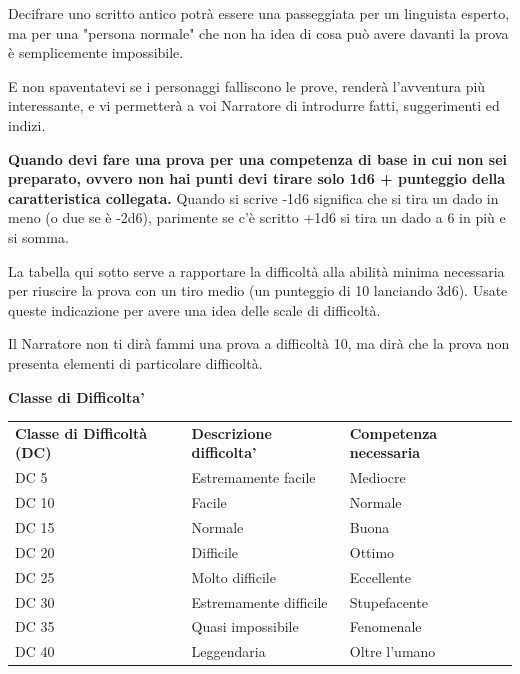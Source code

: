 \documentclass[a4paper,11pt,twoside,openany]{book}
\begin{document}
Decifrare uno scritto antico potrà essere una passeggiata per un linguista esperto, ma per una "persona normale" che non ha idea di cosa può avere davanti la prova è semplicemente impossibile.

E non spaventatevi se i personaggi falliscono le prove, renderà l'avventura più interessante, e vi permetterà a voi Narratore di introdurre fatti, suggerimenti ed indizi.

\bigskip

\textbf{Quando devi fare una prova per una competenza di base in cui non sei preparato, ovvero non hai punti devi tirare solo 1d6 + punteggio della caratteristica collegata.}
Quando si scrive -1d6 significa che si tira un dado in meno (o due se è -2d6), parimente se c'è scritto +1d6 si tira un dado a 6 in più e si somma.

\bigskip

La tabella qui sotto serve a rapportare la difficoltà alla abilità minima necessaria per riuscire la prova con un tiro medio (un punteggio di 10 lanciando 3d6). Usate queste indicazione per avere una idea delle scale di difficoltà.

Il Narratore non ti dirà fammi una prova a difficoltà 10, ma dirà che la prova non presenta elementi di particolare difficoltà.

\bigskip

\textbf{Classe di Difficolta'}
\medskip

\begin{tabular}{lll}
	\toprule
	\textbf{Classe di Difficoltà (DC)} & \textbf{Descrizione difficolta'} & \textbf{ Competenza necessaria}\\
	DC 5               & Estremamente facile              & Mediocre\\
	DC 10              & Facile           & Normale\\
	DC 15              & Normale          & Buona\\
	DC 20              & Difficile        & Ottimo\\
	DC 25              & Molto difficile  & Eccellente\\
	DC 30              & Estremamente difficile           & Stupefacente\\
	DC 35              & Quasi impossibile& Fenomenale\\
	DC 40              & Leggendaria      & Oltre l'umano\\
\end{tabular}
\end{document}
